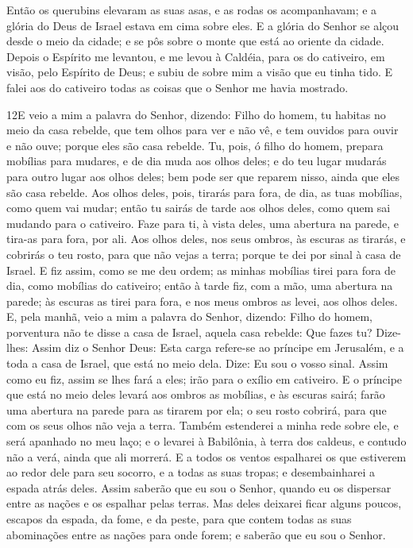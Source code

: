 Então os querubins elevaram as suas asas, e as rodas os
acompanhavam; e a glória do Deus de Israel estava em cima sobre
eles. E a glória do Senhor se alçou desde o meio da cidade; e
se pôs sobre o monte que está ao oriente da cidade. Depois o
Espírito me levantou, e me levou à Caldéia, para os do cativeiro, em
visão, pelo Espírito de Deus; e subiu de sobre mim a visão que eu
tinha tido. E falei aos do cativeiro todas as coisas que o
Senhor me havia mostrado.

\medskip

\lettrine{12} E veio a mim a palavra do Senhor, dizendo:
Filho do homem, tu habitas no meio da casa rebelde, que tem
olhos para ver e não vê, e tem ouvidos para ouvir e não ouve; porque
eles são casa rebelde. Tu, pois, ó filho do homem, prepara
mobílias para mudares, e de dia muda aos olhos deles; e do teu lugar
mudarás para outro lugar aos olhos deles; bem pode ser que reparem
nisso, ainda que eles são casa rebelde. Aos olhos deles, pois,
tirarás para fora, de dia, as tuas mobílias, como quem vai mudar;
então tu sairás de tarde aos olhos deles, como quem sai mudando para
o cativeiro. Faze para ti, à vista deles, uma abertura na
parede, e tira-as para fora, por ali. Aos olhos deles, nos seus
ombros, às escuras as tirarás, e cobrirás o teu rosto, para que não
vejas a terra; porque te dei por sinal à casa de Israel. E fiz
assim, como se me deu ordem; as minhas mobílias tirei para fora de
dia, como mobílias do cativeiro; então à tarde fiz, com a mão, uma
abertura na parede; às escuras as tirei para fora, e nos meus ombros
as levei, aos olhos deles. E, pela manhã, veio a mim a palavra
do Senhor, dizendo: Filho do homem, porventura não te disse a
casa de Israel, aquela casa rebelde: Que fazes tu? Dize-lhes:
Assim diz o Senhor Deus: Esta carga refere-se ao príncipe em
Jerusalém, e a toda a casa de Israel, que está no meio dela.
Dize: Eu sou o vosso sinal. Assim como eu fiz, assim se lhes
fará a eles; irão para o exílio em cativeiro. E o príncipe
que está no meio deles levará aos ombros as mobílias, e às escuras
sairá; farão uma abertura na parede para as tirarem por ela; o seu
rosto cobrirá, para que com os seus olhos não veja a terra.
Também estenderei a minha rede sobre ele, e será apanhado no
meu laço; e o levarei à Babilônia, à terra dos caldeus, e contudo
não a verá, ainda que ali morrerá. E a todos os ventos
espalharei os que estiverem ao redor dele para seu socorro, e a
todas as suas tropas; e desembainharei a espada atrás deles.
Assim saberão que eu sou o Senhor, quando eu os dispersar
entre as nações e os espalhar pelas terras. Mas deles
deixarei ficar alguns poucos, escapos da espada, da fome, e da
peste, para que contem todas as suas abominações entre as nações
para onde forem; e saberão que eu sou o Senhor.

